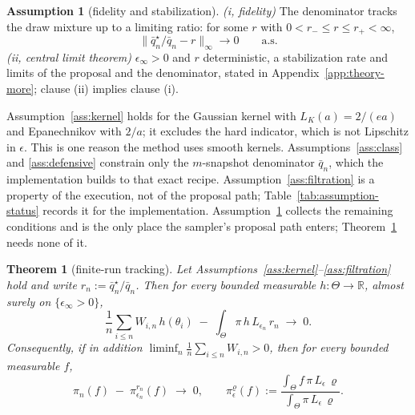 \documentclass[10pt]{article}
\theoremstyle{plain}
\newtheorem{theorem}{Theorem}
\theoremstyle{definition}
\newtheorem{assumption}{Assumption}
\begin{document}
\begin{assumption}[fidelity and stabilization]\label{ass:stab} \emph{(i, fidelity)} The denominator tracks the draw mixture up to a limiting ratio: for some $r$ with $0<r_-\le r\le r_+<\infty$,
\begin{equation}
\bigl\|\bar q^\star_n/\bar q_n-r\bigr\|_\infty\longrightarrow0\qquad\text{a.s.}
\label{eq:fidelity}
\end{equation}
\emph{(ii, central limit theorem)} $\epsilon_\infty>0$ and $r$ deterministic, a stabilization rate and limits of the proposal and the denominator, stated in Appendix~\ref{app:theory-more}; clause (ii) implies clause (i).
\end{assumption}

Assumption~\ref{ass:kernel} holds for the Gaussian kernel with $L_K(a)=2/(ea)$ and Epanechnikov with $2/a$; it excludes the hard indicator, which is not Lipschitz in $\epsilon$. This is one reason the method uses smooth kernels. Assumptions~\ref{ass:class} and \ref{ass:defensive} constrain only the $m$-snapshot denominator $\bar q_n$, which the implementation builds to that exact recipe. Assumption~\ref{ass:filtration} is a property of the execution, not of the proposal path; Table~\ref{tab:assumption-status} records it for the implementation. Assumption~\ref{ass:stab} collects the remaining conditions and is the only place the sampler's proposal path enters; Theorem~\ref{thm:consistency} needs none of it.

\begin{theorem}[finite-run tracking]\label{thm:consistency}
Let Assumptions~\ref{ass:kernel}--\ref{ass:filtration} hold and write $r_n:=\bar q^\star_n/\bar q_n$. Then for every bounded measurable $h:\Theta\to\mathbb{R}$, almost surely on $\{\epsilon_\infty>0\}$,
\begin{equation}
\frac1n\sum_{i\le n}W_{i,n}\,h(\theta_i)\;-\;\int_\Theta \pi\,h\,L_{\epsilon_n}\,r_n\;\longrightarrow\;0 .
\label{eq:tracking}
\end{equation}
Consequently, if in addition $\liminf_n\tfrac1n\sum_{i\le n}W_{i,n}>0$, then for every bounded measurable $f$,
\begin{equation}
\widehat\pi_n(f)\;-\;\pi^{r_n}_{\epsilon_n}(f)\;\longrightarrow\;0,
\qquad
\pi^{\varrho}_{\epsilon}(f):=\frac{\int_\Theta f\,\pi\,L_{\epsilon}\,\varrho}{\int_\Theta \pi\,L_{\epsilon}\,\varrho}.
\label{eq:tracking-ratio}
\end{equation}
\end{theorem}
\end{document}

